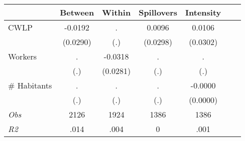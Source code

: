 \begin{tabular}{l*{6}{c}}\hline&\multicolumn{1}{c}{Between}&\multicolumn{1}{c}{Within}&\multicolumn{1}{c}{Spillovers}&\multicolumn{1}{c}{Intensity}\\ \hline 
CWLP & -0.0192 & . & 0.0096 & 0.0106 \\
 & (0.0290) & (.) & (0.0298) & (0.0302) \\
Workers & . & -0.0318 & . & . \\
 & (.) & (0.0281) & (.) & (.) \\
\# Habitants & . & . & . & -0.0000 \\
  & (.) & (.) & (.) & (0.0000) \\
\hline \textit{Obs} & 2126 & 1924 & 1386 & 1386  \\ \textit{R2} & .014 & .004 & 0 & .001 \\ \hline \end{tabular}
